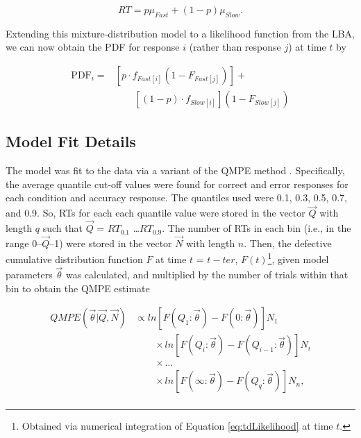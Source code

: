 \documentclass[a4paper, man, natbib]{apa6}
\begin{document}
\begin{equation}
RT = p\mu_{Fast} + (1 - p)\mu_{Slow}.
\end{equation}

Extending this mixture-distribution model to a likelihood function from the LBA, we can now obtain the PDF for response $i$ (rather than response $j$) at time $t$ by 

\begin{equation}
\begin{aligned}
\mbox{PDF}_{i} = & \left[p \cdot f_{Fast[i]}(1 - F_{Fast[j]})\right] + \\ 
&\qquad \left[(1 - p) \cdot f_{Slow[i]}\right] (1 - F_{Slow[j]})
\end{aligned}
\label{eq:tdLikelihood}
\end{equation}

\subsection{Model Fit Details}
The model was fit to the data via a variant of the QMPE method \citep{Heathcote2002}. Specifically, the average quantile cut-off values were found for correct and error responses for each condition and accuracy response. The quantiles used were 0.1, 0.3, 0.5, 0.7, and 0.9. So, RTs for each each quantile value were stored in the vector $\vec{Q}$ with length $q$ such that $\vec{Q}$ = $RT_{0.1}$ \ldots $RT_{0.9}$. The number of RTs in each bin (i.e., in the range 0--$\vec{Q}$--1) were stored in the vector $\vec{N}$ with length $n$. Then, the defective cumulative distribution function $F$ at time $t$ = $t-ter$, $F(t)$\footnote{Obtained via numerical integration of Equation \ref{eq:tdLikelihood} at time $t$.}, given model parameters $\vec{\theta}$ was calculated, and multiplied by the number of trials within that bin to obtain the QMPE estimate 

\begin{equation}
\begin{aligned}
QMPE\left(\vec{\theta} | \vec{Q}, \vec{N}\right) & \propto ln\left[F\left(Q_{1}:\vec{\theta}\right) - F\left(0:\vec{\theta}\right)\right]N_{1} \\ 
& \qquad \times ln\left[F\left(Q_{i}:\vec{\theta}\right) - F\left(Q_{i - 1}:\vec{\theta}\right)\right]N_{i} \\
& \qquad \times \ldots \\
& \qquad \times ln\left[F\left(\infty:\vec{\theta}\right) - F\left(Q_{q}:\vec{\theta}\right)\right]N_{n}, \\
\end{aligned}
\label{eq:qmp}
\end{equation}
\end{document}
